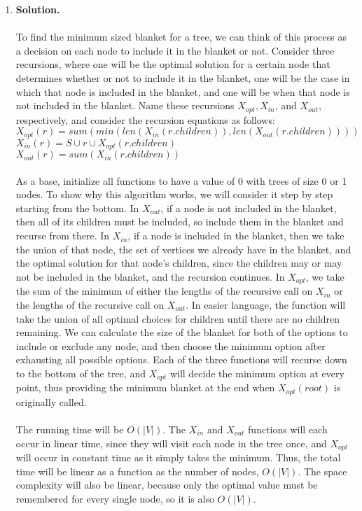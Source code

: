 \documentclass[11pt]{article}
\newcommand\solution{%
  \textbf{Solution.}\\%
}
\begin{document}
\begin{enumerate}
\item 

\solution \\
To find the minimum sized blanket for a tree, we can think of this process as a decision on each node to include it in the blanket or not. Consider three recursions, where one will be the optimal solution for a certain node that determines whether or not to include it in the blanket, one will be the case in which that node is included in the blanket, and one will be when that node is not included in the blanket. Name these recursions $X_{opt}, X_{in}$, and $X_{out}$, respectively, and consider the recursion equations as follows: \\
$X_{opt}(r) = sum(min(len(X_{in}(r.children)), len(X_{out}(r.children))))$ \\
$X_{in}(r) = S \cup r \cup X_{opt}(r.children)$ \\ 
$X_{out}(r) = sum(X_{in}(r.children))$ \\
\\
As a base, initialize all functions to have a value of 0 with trees of size 0 or 1 nodes. To show why this algorithm works, we will consider it step by step starting from the bottom. In $X_{out}$, if a node is not included in the blanket, then all of its children must be included, so include them in the blanket and recurse from there. In $X_{in}$, if a node is included in the blanket, then we take the union of that node, the set of vertices we already have in the blanket, and the optimal solution for that node's children, since the children may or may not be included in the blanket, and the recursion continues. In $X_{opt}$, we take the sum of the minimum of either the lengths of the recursive call on $X_{in}$ or the lengths of the recursive call on $X_{out}$. In easier language, the function will take the union of all optimal choices for children until there are no children remaining. We can calculate the size of the blanket for both of the options to include or exclude any node, and then choose the minimum option after exhausting all possible options. Each of the three functions will recurse down to the bottom of the tree, and $X_{opt}$ will decide the minimum option at every point, thus providing the minimum blanket at the end when $X_{opt}(root)$ is originally called. \\
\\
The running time will be $O(|V|)$. The $X_{in}$ and $X_{out}$ functions will each occur in linear time, since they will visit each node in the tree once, and $X_{opt}$ will occur in constant time as it simply takes the minimum. Thus, the total time will be linear as a function as the number of nodes, $O(|V|)$. The space complexity will also be linear, because only the optimal value must be remembered for every single node, so it is also $O(|V|)$. 



\end{enumerate}
\end{document}
